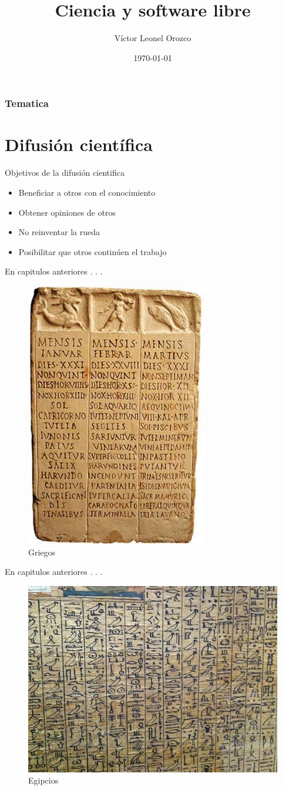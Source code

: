 \documentclass{beamer}
\title[Ciencia y FLOSS]{Ciencia y software libre}
\author[Lopez. V.L.O]{Víctor Leonel Orozco}
\institute[UFSM]{
  Centro de Tecnologia \\
  Universidade Federal de Santa Maria
}
\date{\today}
\begin{document}
\begin{frame}[Plain]
\titlepage
\end{frame}

\begin{frame}
\frametitle{Tematica}
\tableofcontents
\end{frame}

\section{Difusión científica}
\begin{frame}{Objetivos de la difusión cientifica}
\begin{itemize}
\item Beneficiar a otros con el conocimiento
\item Obtener opiniones de otros
\item No reinventar la rueda
\item Posibilitar que otros continúen el trabajo
\end{itemize}
\end{frame}

\begin{frame}{En capitulos anteriores . . .}

\begin{figure}[tbph]
\centering
\includegraphics[width=0.35\linewidth]{Figures/1360}
\caption{Griegos}
\label{fig:1360}
\end{figure}
\end{frame}

\begin{frame}{En capitulos anteriores . . .}

\begin{figure}[tbph]
\centering
\includegraphics[width=0.7\linewidth]{./Figures/Libro-de-los-muertos}
\caption{Egipcios}
\label{fig:Libro-de-los-muertos}
\end{figure}
\end{frame}
\end{document}
